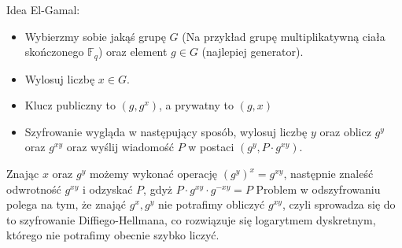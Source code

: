 Idea El-Gamal:
\begin{itemize}
    \item Wybierzmy sobie jakąś grupę $G$ (Na przykład grupę multiplikatywną ciała skończonego $\mathbb{F}_q$) oraz element $g \in G$ (najlepiej generator).
    \item Wylosuj liczbę $x \in G$.
    \item Klucz publiczny to $(g,g^x)$, a prywatny to $(g,x)$
    \item Szyfrowanie wygląda w następujący sposób, wylosuj liczbę $y$ oraz oblicz $g^y$ oraz $g^{xy}$ oraz wyślij wiadomość $P$ w postaci $(g^y,P\cdot g^{xy})$. 
\end{itemize}
Znając $x$ oraz $g^y$ możemy wykonać operację $(g^y)^x = g^{xy}$, następnie znaleść odwrotność $g^{xy}$ i odzyskać $P$, gdyż $P\cdot g^{xy} \cdot g^{-xy} = P$
\newline \newline
Problem w odszyfrowaniu polega na tym, że znająć $g^x,g^y$ nie potrafimy obliczyć $g^{xy}$, czyli sprowadza się do to szyfrowanie Diffiego-Hellmana, co rozwiązuje się logarytmem dyskretnym, którego nie potrafimy obecnie szybko liczyć.


